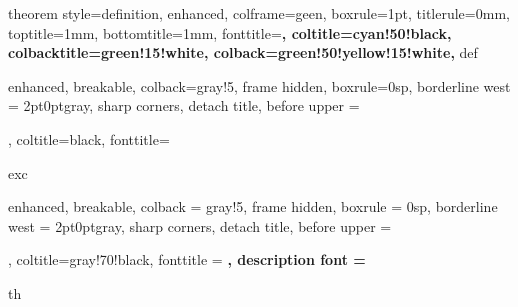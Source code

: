\usepackage{enumerate}
\usepackage{framed}
\usepackage{amsmath,amsfonts,amsthm,thmtools,amssymb,mathtools,commath}
\usepackage{tikz}
\usepackage{xcolor}
\usepackage[most]{tcolorbox}
\usepackage{cleveref}

%
{
    theorem style=definition,
    enhanced,
    colframe=geen,
    boxrule=1pt,
    titlerule=0mm,
    toptitle=1mm,
    bottomtitle=1mm,
    fonttitle=\bfseries,
    coltitle=cyan!50!black,
    colbacktitle=green!15!white,
    colback=green!50!yellow!15!white,
}{def}



%
{
    enhanced,
    breakable,
    colback=gray!5,
    frame hidden,
    boxrule=0sp,
    borderline west = {2pt}{0pt}{gray},
    sharp corners,
    detach title,
    before upper = \tcbtitle\par\smallskip,
    coltitle=black,
    fonttitle=\bfseries\sffamily
}{exc}


{%
	enhanced,
	breakable,
	colback = gray!5,
	frame hidden,
	boxrule = 0sp,
	borderline west = {2pt}{0pt}{gray},
	sharp corners,
	detach title,
	before upper = \tcbtitle\par\smallskip,
    coltitle=gray!70!black,
	fonttitle = \bfseries\sffamily,
	description font = \mdseries
}
{th}
